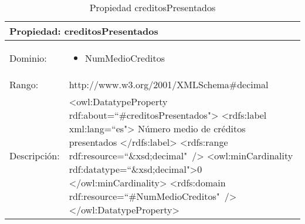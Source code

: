 \begin{table}[!ht]
	\centering
	\begin{tabular}{|p{}|p{}|}
		\hline
		\multicolumn{2}{|l|}{Propiedad: \textbf{creditosPresentados}}
		\\ \hline
		Dominio:&
		\begin{itemize}
			\item NumMedioCreditos
		\end{itemize}
		\\ \hline
		Rango:&
		http://www.w3.org/2001/XMLSchema\#decimal
		\\ \hline
		Descripción:&
		\textless owl:DatatypeProperty rdf:about=``\#creditosPresentados"\textgreater\newline 
		\tab\textless rdfs:label xml:lang=``es"\textgreater\newline
		\tab\tab Número medio de créditos presentados\newline
		\tab\textless /rdfs:label\textgreater\newline
		\tab\textless rdfs:range\newline
		\tab\tab rdf:resource=``\&xsd;decimal"\ /\textgreater\newline
		\tab\textless owl:minCardinality \newline
		\tab\tab rdf:datatype=``\&xsd;decimal"\textgreater0\newline
		\tab\textless /owl:minCardinality\textgreater\newline
		\tab\textless rdfs:domain\newline
		\tab\tab rdf:resource=``\#NumMedioCreditos"\ /\textgreater\newline
		\textless /owl:DatatypeProperty\textgreater
		\\ \hline
	\end{tabular}
	\caption{Propiedad creditosPresentados}
	\label{propiedad-creditospresentados}
\end{table}

